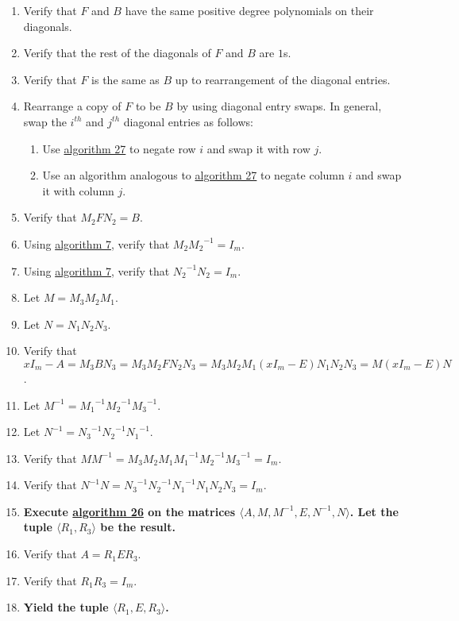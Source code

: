 \documentclass[twocolumn]{article}
\begin{document}
\begin{enumerate}
				\item Verify that $F$ and $B$ have the same positive degree polynomials on their diagonals.
				\item Verify that the rest of the diagonals of $F$ and $B$ are $1$s.
				\item Verify that $F$ is the same as $B$ up to rearrangement of the diagonal entries.
				\item Rearrange a copy of $F$ to be $B$ by using diagonal entry swaps. In general, swap the $i^{th}$ and $j^{th}$ diagonal entries as follows:
				\begin{enumerate}
					\item Use \hyperref[sec:algorithm 27]{algorithm 27} to negate row $i$ and swap it with row $j$.
					\item Use an algorithm analogous to \hyperref[sec:algorithm 27]{algorithm 27} to negate column $i$ and swap it with column $j$.
				\end{enumerate}
				\item Verify that $M_2FN_2=B$.
				\item Using \hyperref[sec:algorithm 7]{algorithm 7}, verify that $M_2{M_2}^{-1}=I_m$.
				\item Using \hyperref[sec:algorithm 7]{algorithm 7}, verify that ${N_2}^{-1}N_2=I_m$.
				\item Let $M=M_3M_2M_1$.
				\item Let $N=N_1N_2N_3$.
				\item Verify that $xI_m-A=M_3BN_3=M_3M_2FN_2N_3=M_3M_2M_1(xI_m-E)N_1N_2N_3=M(xI_m-E)N$.
				\item Let $M^{-1}={M_1}^{-1}{M_2}^{-1}{M_3}^{-1}$.
				\item Let $N^{-1}={N_3}^{-1}{N_2}^{-1}{N_1}^{-1}$.
				\item Verify that $MM^{-1}=M_3M_2M_1{M_1}^{-1}{M_2}^{-1}{M_3}^{-1}=I_m$.
				\item Verify that $N^{-1}N={N_3}^{-1}{N_2}^{-1}{N_1}^{-1}N_1N_2N_3=I_m$.
				\item \textbf{Execute \hyperref[sec:algorithm 26]{algorithm 26} on the matrices $\langle A,M,M^{-1},E,N^{-1},N\rangle$. Let the tuple $\langle R_1,R_3\rangle$ be the result.}
				\item Verify that $A=R_1ER_3$.
				\item Verify that $R_1R_3=I_m$.
				\item \textbf{Yield the tuple $\langle R_1,E,R_3\rangle$.}
			\end{enumerate}
\end{document}
